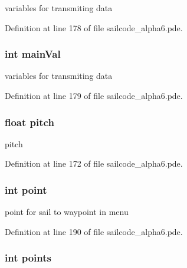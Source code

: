 variables for transmiting data 



\-Definition at line 178 of file sailcode\-\_\-alpha6.\-pde.

\hypertarget{group__group1_ga3c5dac52b53dc3642a843a7d6a9266ca}{
\subsubsection[{main\-Val}]{\setlength{\rightskip}{0pt plus 5cm}int {\bf main\-Val}}}
\label{group__group1_ga3c5dac52b53dc3642a843a7d6a9266ca}


variables for transmiting data 



\-Definition at line 179 of file sailcode\-\_\-alpha6.\-pde.

\hypertarget{group__group1_ga282e7d4378d4a18a805b8980295ac86c}{
\subsubsection[{pitch}]{\setlength{\rightskip}{0pt plus 5cm}float {\bf pitch}}}
\label{group__group1_ga282e7d4378d4a18a805b8980295ac86c}


pitch 



\-Definition at line 172 of file sailcode\-\_\-alpha6.\-pde.

\hypertarget{group__group1_ga2dee8b7fcecc7c2d190e9304b43ea886}{
\subsubsection[{point}]{\setlength{\rightskip}{0pt plus 5cm}int {\bf point}}}
\label{group__group1_ga2dee8b7fcecc7c2d190e9304b43ea886}


point for sail to waypoint in menu 



\-Definition at line 190 of file sailcode\-\_\-alpha6.\-pde.

\hypertarget{group__group1_gaf7f8f4a4e39e09fdb5e9f02330ecabef}{
\subsubsection[{points}]{\setlength{\rightskip}{0pt plus 5cm}int {\bf points}}}
\label{group__group1_gaf7f8f4a4e39e09fdb5e9f02330ecabef}


